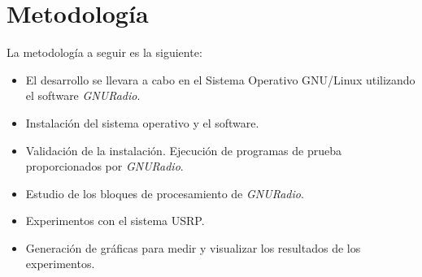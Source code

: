 \section{Metodolog\'ia}

La metodolog\'ia a seguir es la siguiente:
\begin{itemize}
  \item El desarrollo se llevara a cabo en el Sistema Operativo GNU/Linux
  utilizando el software \emph{GNURadio}.
  \item Instalaci\'on del sistema operativo y el software.
  \item Validaci\'on de la instalaci\'on. Ejecuci\'on de programas de prueba
  proporcionados por \emph{GNURadio}.
  \item Estudio de los bloques de procesamiento de \emph{GNURadio}.
  \item Experimentos con el sistema USRP.
  \item Generaci\'on de gr\'aficas para medir y visualizar los resultados de los
  experimentos.
\end{itemize}